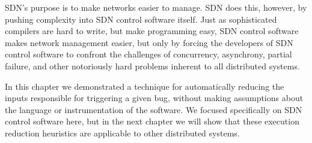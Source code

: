 
SDN's purpose is to make networks easier to manage. SDN
does this, however, by pushing complexity into SDN control software itself. Just
as sophisticated compilers are hard to write, but make programming easy, SDN
control software makes network management easier, but only by forcing the
developers of SDN control software to confront the challenges of concurrency, asynchrony,
partial failure, and other notoriously hard problems inherent to all distributed
systems.

In this chapter we demonstrated a technique for automatically
reducing the inputs responsible for triggering a given
bug, without making assumptions about the language or instrumentation of the
software. We focused specifically on SDN control software here, but in the
next chapter we will show that these execution reduction heuristics are applicable
to other distributed systems.




